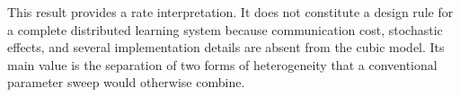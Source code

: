 This result provides a rate interpretation. It does not constitute a design rule for a complete distributed learning system because communication cost, stochastic effects, and several implementation details are absent from the cubic model. Its main value is the separation of two forms of heterogeneity that a conventional parameter sweep would otherwise combine.

